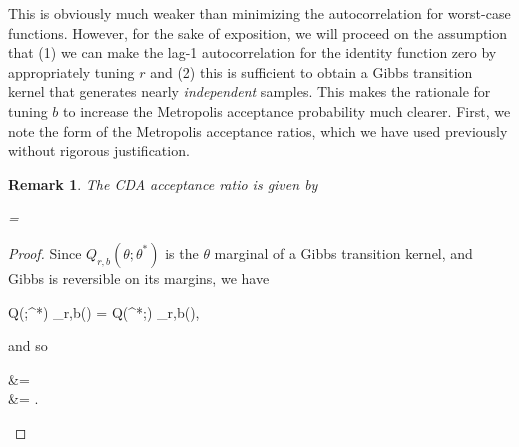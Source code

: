\documentclass[10pt]{article}
\newtheorem{remark}{Remark}
\newcommand{\be}{\begin{equs}}
\newcommand{\ee}{\end{equs}}
\begin{document}
This is obviously much weaker than minimizing the autocorrelation for worst-case functions. However, for the sake of exposition, we will proceed on the assumption that (1) we can make the lag-1 autocorrelation for the identity function zero by appropriately tuning $r$ and (2) this is sufficient to obtain a Gibbs transition kernel that generates nearly \emph{independent} samples. This makes the rationale for tuning $b$ to increase the Metropolis acceptance probability much clearer. First, we note the form of the Metropolis acceptance ratios, which we have used previously without rigorous justification.
\begin{remark}
The CDA acceptance ratio is given by
\be
{} =  \label{eq:mh-accrat}
\ee
\end{remark}
\begin{proof}
Since $Q_{r,b}(\theta;\theta^*)$ is the $\theta$ marginal of a Gibbs transition kernel, and Gibbs is reversible on its margins, we have
\be
Q(\theta;\theta^*) \Pi_{r,b}(\theta) = Q(\theta^*;\theta) \Pi_{r,b}(\theta),
\ee 
and so
\be
{} &=  \\
&= .
\ee
\end{proof}
\end{document}
